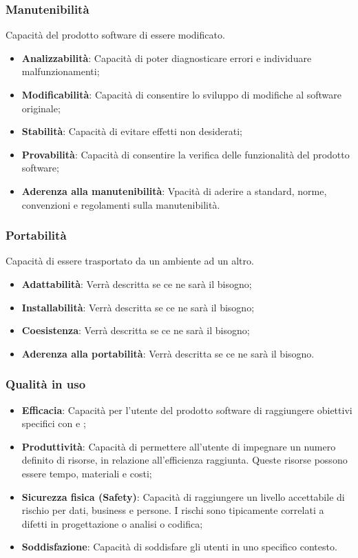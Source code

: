 \subsubsection{Manutenibilità}
Capacità del prodotto software di essere modificato.
\begin{itemize}
\item \textbf{Analizzabilità}: Capacità di poter diagnosticare errori e individuare malfunzionamenti;
\item \textbf{Modificabilità}: Capacità di consentire lo sviluppo di modifiche al software originale;
\item \textbf{Stabilità}: Capacità di evitare effetti non desiderati;
\item \textbf{Provabilità}: Capacità di consentire la verifica delle funzionalità del prodotto software;
\item \textbf{Aderenza alla manutenibilità}: Vpacità di aderire a standard, norme, convenzioni e regolamenti sulla manutenibilità.
\end{itemize}

\subsubsection{Portabilità}
Capacità di essere trasportato da un ambiente ad un altro.
\begin{itemize}
\item \textbf{Adattabilità}: Verrà descritta se ce ne sarà il bisogno;
\item \textbf{Installabilità}: Verrà descritta se ce ne sarà il bisogno;
\item \textbf{Coesistenza}: Verrà descritta se ce ne sarà il bisogno;
\item \textbf{Aderenza alla portabilità}: Verrà descritta se ce ne sarà il bisogno.
\end{itemize}

\subsubsection{Qualità in uso}
\begin{itemize}
\item \textbf{Efficacia}: Capacità per l’utente del prodotto software di raggiungere obiettivi specifici con  e ;
\item \textbf{Produttività}: Capacità di permettere all’utente di impegnare un numero definito di risorse, in relazione all’efficienza raggiunta. Queste risorse possono essere tempo, materiali e costi;
\item \textbf{Sicurezza fisica (Safety)}: Capacità di raggiungere un livello accettabile di rischio per dati, business e persone. I rischi sono tipicamente correlati a difetti in progettazione o analisi o codifica;
\item \textbf{Soddisfazione}: Capacità di soddisfare gli utenti in uno specifico contesto.
\end{itemize}